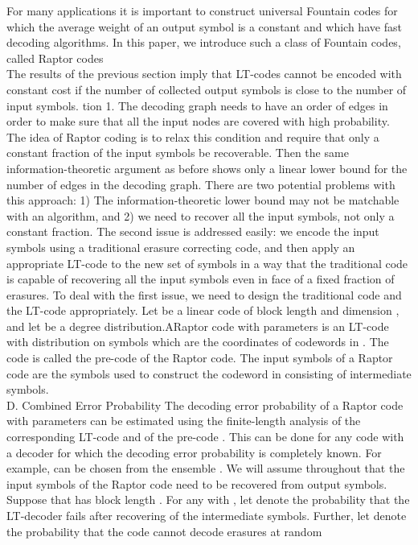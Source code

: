 \documentclass[12pt,a4paper,titlepage,twocolumn]{article}
\begin{document}
For many applications it is important to construct universal
Fountain codes for which the average weight of an output
symbol is a constant and which have fast decoding algorithms.
In this paper, we introduce such a class of Fountain codes,
called Raptor codes\\
The results of the previous section imply that LT-codes
cannot be encoded with constant cost if the number of collected
output symbols is close to the number of input symbols. tion 1. The decoding graph needs to have an order of
edges in order to make sure that all the input nodes are covered
with high probability. The idea of Raptor coding is to relax
this condition and require that only a constant fraction of the
input symbols be recoverable. Then the same information-theoretic
argument as before shows only a linear lower bound for
the number of edges in the decoding graph.
There are two potential problems with this approach: 1) The
information-theoretic lower bound may not be matchable with
an algorithm, and 2) we need to recover all the input symbols,
not only a constant fraction.
The second issue is addressed easily: we encode the input
symbols using a traditional erasure correcting code, and then
apply an appropriate LT-code to the new set of symbols in a
way that the traditional code is capable of recovering all the
input symbols even in face of a fixed fraction of erasures. To
deal with the first issue, we need to design the traditional code
and the LT-code appropriately.
Let be a linear code of block length and dimension , and
let be a degree distribution.ARaptor code with parameters
is an LT-code with distribution on symbols
which are the coordinates of codewords in . The code is
called the pre-code of the Raptor code. The input symbols of a
Raptor code are the symbols used to construct the codeword in
consisting of intermediate symbols.\\
D. Combined Error Probability
The decoding error probability of a Raptor code with parameters
can be estimated using the finite-length analysis
of the corresponding LT-code and of the pre-code . This
can be done for any code with a decoder for which the decoding
error probability is completely known. For example,
can be chosen from the ensemble .
We will assume throughout that the input symbols of the
Raptor code need to be recovered from output symbols.
Suppose that has block length . For any with , let
denote the probability that the LT-decoder fails after recovering
of the intermediate symbols. Further, let denote the
probability that the code cannot decode erasures at random
\end{document}

